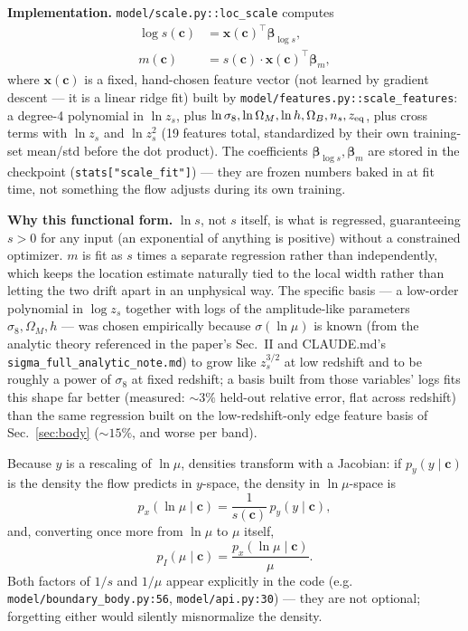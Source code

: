 \documentclass[11pt]{article}
\newcommand{\code}[1]{\texttt{#1}}
\newcommand{\file}[1]{\texttt{#1}}
\newcommand{\vect}[1]{\boldsymbol{#1}}
\begin{document}
\textbf{Implementation.} \file{model/scale.py::loc\_scale} computes
\begin{align}
 \log s(\vect c) &= \vect x(\vect c)^{\!\top}\vect\beta_{\log s}, \\
 m(\vect c) &= s(\vect c)\cdot \vect x(\vect c)^{\!\top}\vect\beta_{m},
\end{align}
where $\vect x(\vect c)$ is a fixed, hand-chosen feature vector (not learned
by gradient descent — it is a linear ridge fit) built by
\file{model/features.py::scale\_features}: a degree-4 polynomial in $\ln
z_s$, plus $\ln\sigma_8,\ln\Omega_M,\ln h,\Omega_B,n_s,z_{\rm eq}$, plus
cross terms with $\ln z_s$ and $\ln z_s^2$ (19 features total, standardized
by their own training-set mean/std before the dot product). The
coefficients $\vect\beta_{\log s},\vect\beta_m$ are stored in the checkpoint
(\code{stats["scale\_fit"]}) — they are frozen numbers baked in at fit time,
not something the flow adjusts during its own training.

\textbf{Why this functional form.} $\ln s$, not $s$ itself, is what is
regressed, guaranteeing $s>0$ for any input (an exponential of anything is
positive) without a constrained optimizer. $m$ is fit as $s$ times a
separate regression rather than independently, which keeps the location
estimate naturally tied to the local width rather than letting the two
drift apart in an unphysical way. The specific basis — a low-order
polynomial in $\log z_s$ together with logs of the amplitude-like
parameters $\sigma_8,\Omega_M,h$ — was chosen empirically because
$\sigma(\ln\mu)$ is known (from the analytic theory referenced in the
paper's Sec.~II and CLAUDE.md's \code{sigma\_full\_analytic\_note.md}) to
grow like $z_s^{3/2}$ at low redshift and to be roughly a power of $\sigma_8$
at fixed redshift; a basis built from those variables' logs fits this shape
far better (measured: $\sim 3\%$ held-out relative error, flat across
redshift) than the same regression built on the low-redshift-only edge
feature basis of Sec.~\ref{sec:body} ($\sim15\%$, and worse per band).

Because $y$ is a rescaling of $\ln\mu$, densities transform with a Jacobian:
if $p_y(y\mid\vect c)$ is the density the flow predicts in $y$-space, the
density in $\ln\mu$-space is
\begin{equation}
 p_x(\ln\mu\mid\vect c) = \frac{1}{s(\vect c)}\, p_y(y\mid\vect c),
 \label{eq:ln-jacobian}
\end{equation}
and, converting once more from $\ln\mu$ to $\mu$ itself,
\begin{equation}
 p_I(\mu\mid\vect c) = \frac{p_x(\ln\mu\mid\vect c)}{\mu}.
 \label{eq:mu-jacobian}
\end{equation}
Both factors of $1/s$ and $1/\mu$ appear explicitly in the code (e.g.
\file{model/boundary\_body.py:56}, \file{model/api.py:30}) — they are not
optional; forgetting either would silently misnormalize the density.
\end{document}
